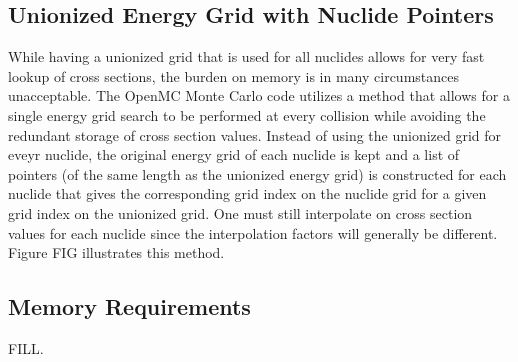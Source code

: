 \subsection{Unionized Energy Grid with Nuclide Pointers}

While having a unionized grid that is used for all nuclides allows for very fast
lookup of cross sections, the burden on memory is in many circumstances
unacceptable. The OpenMC Monte Carlo code utilizes a method that allows for a
single energy grid search to be performed at every collision while avoiding the
redundant storage of cross section values. Instead of using the unionized grid
for eveyr nuclide, the original energy grid of each nuclide is kept and a list
of pointers (of the same length as the unionized energy grid) is constructed for
each nuclide that gives the corresponding grid index on the nuclide grid for a
given grid index on the unionized grid. One must still interpolate on cross
section values for each nuclide since the interpolation factors will generally
be different. Figure FIG illustrates this method.

\subsection{Memory Requirements}

FILL.

